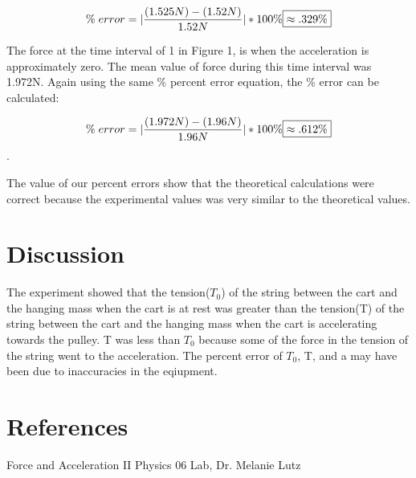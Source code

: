 \documentclass[aps,letterpaper,11pt]{revtex4}
\begin{document}
$$ \% \hspace{1mm} error = |\frac{(1.525N) - (1.52N)}{1.52N}|*100\% \boxed{\approx .329\%} $$

The force at the time interval of 1 in Figure 1, is when the acceleration is approximately zero. The mean value of force during this time interval was 1.972N. Again using the same \% percent error equation, the \% error can be calculated:

$$ \% \hspace{1mm} error = |\frac{(1.972N) - (1.96N)}{1.96N}|*100\% \boxed{\approx .612\%} $$.

The value of our percent errors show that the theoretical calculations were correct because the experimental values was very similar to the theoretical values.

\section{Discussion} 

The experiment showed that the tension($T_0$) of the string between the cart and the hanging mass when the cart is at rest was greater than the tension(T) of the string between the cart and the hanging mass when the cart is accelerating towards the pulley. 
T was less than $T_0$ because some of the force in the tension of the string went to the acceleration. The percent error of $T_0$, T, and a may have been due to inaccuracies in the eqiupment.  

\section{References}

\hspace{-6.5mm}
Force and Acceleration II Physics 06 Lab, Dr. Melanie Lutz\\
\end{document}
